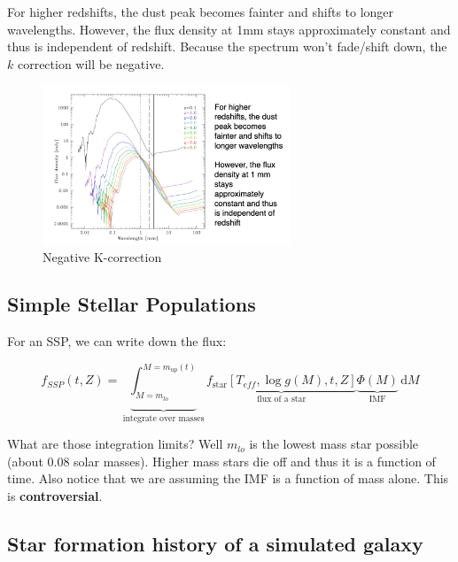 \documentclass{article}
\begin{document}
For higher redshifts, the dust peak becomes fainter and shifts to longer wavelengths. However, the flux density at 1mm stays approximately constant and thus is independent of redshift. Because the spectrum won't fade/shift down, the $k$ correction will be negative. 

\begin{figure}
    \centering
    \includegraphics[width=0.66\textwidth]{figs/Screen Shot 2021-09-24 at 9.29.50 AM.png}
    \caption{Negative K-correction}
    \label{fig:negK}
\end{figure}

\subsection{Simple Stellar Populations}

For an SSP, we can write down the flux:

\begin{equation}
    f_{SSP}(t,Z) = \underbrace{\int_{M=m_{lo}}^{M=m_{up}(t)}}_\text{integrate over masses} \underbrace{f_\text{star}\left[T_{eff},\log g(M), t, Z\right]}_\text{flux of a star}\underbrace{\Phi(M)}_\text{IMF}\, \mathrm{d}M
\end{equation}

What are those integration limits? Well $m_{lo}$ is the lowest mass star possible (about $0.08$ solar masses). Higher mass stars die off and thus it is a function of time. Also notice that we are assuming the IMF is a function of mass alone. This is \textbf{controversial}.

\subsection{Star formation history of a simulated galaxy}
\end{document}
